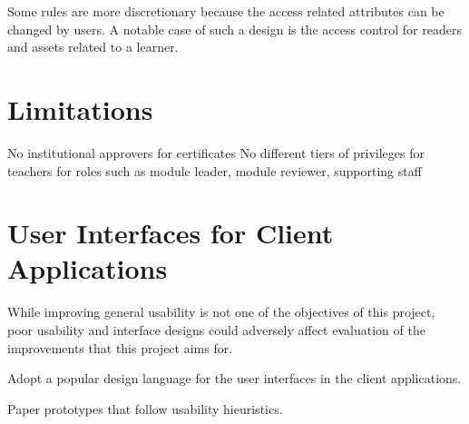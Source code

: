 Some rules are more discretionary because the access related attributes can be changed by users.
A notable case of such a design is the access control for readers and assets related to a learner.

\section{Limitations}
No institutional approvers for certificates
No different tiers of privileges for teachers for roles such as module leader, module reviewer, supporting staff

\section{User Interfaces for Client Applications}

While improving general usability is not one of the objectives of this project, poor usability and interface designs
could adversely affect evaluation of the improvements that this project aims for.

Adopt a popular design language for the user interfaces in the client applications.

Paper prototypes that follow usability hieuristics.